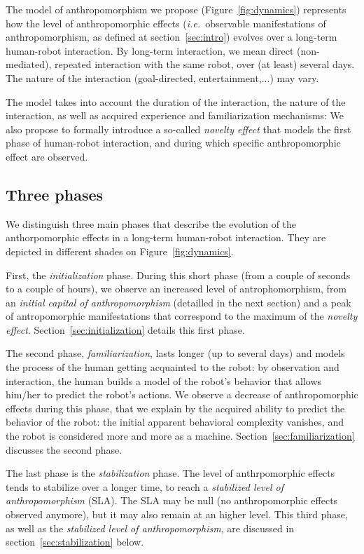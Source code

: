\documentclass[twocolumn]{svjour3}          %
\newcommand{\ie}{{\textit{i.e.~}}}
\begin{document}
The model of anthropomorphism we propose (Figure~\ref{fig:dynamics}) represents
how the level of anthropomorphic effects (\ie observable manifestations of
anthropomorphism, as defined at section~\ref{sec:intro}) evolves over a
long-term human-robot interaction. By long-term interaction, we mean direct
(non-mediated), repeated interaction with the same robot, over (at least) several
days. The nature of the interaction (goal-directed, entertainment,...) may vary.

The model takes into account the duration of the interaction, the nature of the
interaction, as well as acquired experience and familiarization mechanisms: We
also propose to formally introduce a so-called \emph{novelty effect} that
models the first phase of human-robot interaction, and during which specific
anthropomorphic effect are observed.

\subsection{Three phases}
\label{sec:phases}

We distinguish three main phases that describe the evolution of the
anthorpomorphic effects in a long-term human-robot interaction. They are
depicted in different shades on Figure~\ref{fig:dynamics}.

First, the \emph{initialization} phase. During this short phase (from a couple
of seconds to a couple of hours), we observe an increased level of
antrophomorphism, from an \emph{initial capital of anthropomorphism}
(detailled in the next section) and a peak of antropomorphic manifestations
that correspond to the maximum of the \emph{novelty effect}.
Section~\ref{sec:initialization} details this first phase.

The second phase, \emph{familiarization}, lasts longer (up to several days) and
models the process of the human getting acquainted to the robot: by observation
and interaction, the human builds a model of the robot's behavior that allows
him/her to predict the robot's actions. We observe a decrease of
anthropomorphic effects during this phase, that we explain by the acquired
ability to predict the behavior of the robot: the initial apparent behavioral
complexity vanishes, and the robot is considered more and more as a machine.
Section~\ref{sec:familiarization} discusses the second phase.

The last phase is the \emph{stabilization} phase. The level of anthrpomorphic
effects tends to stabilize over a longer time, to reach a \emph{stabilized
level of anthropomorphism} (SLA). The SLA may be null (no anthropomorphic
effects observed anymore), but it may also remain at an higher level.  This
third phase, as well as the \emph{stabilized level of anthropomorphism}, are
discussed in section~\ref{sec:stabilization} below.
\end{document}
